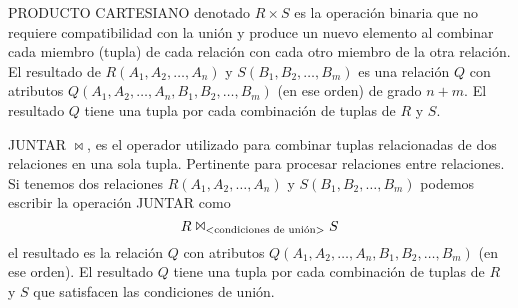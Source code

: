 PRODUCTO CARTESIANO denotado $R \times S$ es la operación binaria que no requiere compatibilidad con la unión y produce un nuevo elemento al combinar cada miembro (tupla) de cada relación con cada otro miembro de la otra relación. El resultado de $R(A_1,A_2,\ldots,A_n)$ y $S(B_1,B_2,\ldots,B_m)$ es una relación $Q$ con atributos $Q(A_1,A_2,\ldots,A_n,B_1,B_2,\ldots,B_m)$ (en ese orden) de grado $n+m$. El resultado $Q$ tiene una tupla por cada combinación de tuplas de $R$ y $S$.

JUNTAR $\Join$, es el operador utilizado para combinar tuplas relacionadas de dos relaciones en una sola tupla. Pertinente para procesar relaciones entre relaciones. Si tenemos dos relaciones $R(A_1,A_2,\ldots,A_n)$ y $S(B_1,B_2,\ldots,B_m)$ podemos escribir la operación JUNTAR como
\begin{equation}
R\Join_\text{\textless condiciones de unión\textgreater}S
\end{equation}
el resultado es la relación $Q$ con atributos $Q(A_1,A_2,\ldots,A_n,B_1,B_2,\ldots,B_m)$ (en ese orden). El resultado $Q$ tiene una tupla por cada combinación de tuplas de $R$ y $S$ que satisfacen las condiciones de unión.\\
